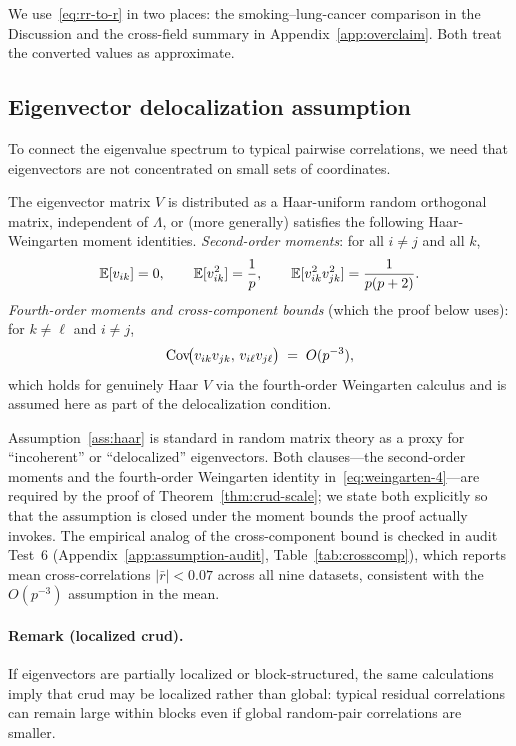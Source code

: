 We use~\eqref{eq:rr-to-r} in two places: the smoking--lung-cancer comparison in the Discussion and the cross-field summary in Appendix~\ref{app:overclaim}. Both treat the converted values as approximate.


\subsection{Eigenvector delocalization assumption}

To connect the eigenvalue spectrum to typical pairwise correlations, we need that eigenvectors are
not concentrated on small sets of coordinates.

\begin{assumption}\label{ass:haar}
The eigenvector matrix $V$ is distributed as a Haar-uniform random orthogonal matrix, independent of
$\Lambda$, or (more generally) satisfies the following Haar-Weingarten moment identities. \emph{Second-order moments}: for all $i\neq j$ and all $k$,
\begin{equation}
\mathbb{E}[v_{ik}]=0,\qquad \mathbb{E}[v_{ik}^2]=\frac{1}{p},\qquad
\mathbb{E}[v_{ik}^2v_{jk}^2]=\frac{1}{p(p+2)}.
\end{equation}
\emph{Fourth-order moments and cross-component bounds} (which the proof below uses): for $k\neq\ell$ and $i\neq j$,
\begin{equation}\label{eq:weingarten-4}
\operatorname{Cov}\!\bigl(v_{ik}v_{jk},\,v_{i\ell}v_{j\ell}\bigr) \;=\; O(p^{-3}),
\end{equation}
which holds for genuinely Haar $V$ via the fourth-order Weingarten calculus and is assumed here as part of the delocalization condition.
\end{assumption}

Assumption~\ref{ass:haar} is standard in random matrix theory as a proxy for ``incoherent'' or
``delocalized'' eigenvectors. Both clauses---the second-order moments and the fourth-order Weingarten identity in~\eqref{eq:weingarten-4}---are required by the proof of Theorem~\ref{thm:crud-scale}; we state both explicitly so that the assumption is closed under the moment bounds the proof actually invokes. The empirical analog of the cross-component bound is checked in audit Test~6 (Appendix~\ref{app:assumption-audit}, Table~\ref{tab:crosscomp}), which reports mean cross-correlations $|\bar r|<0.07$ across all nine datasets, consistent with the $O(p^{-3})$ assumption in the mean.

\paragraph{Remark (localized crud).}
If eigenvectors are partially localized or block-structured, the same calculations imply that crud may be
localized rather than global: typical residual correlations can remain large within blocks even if global
random-pair correlations are smaller.

